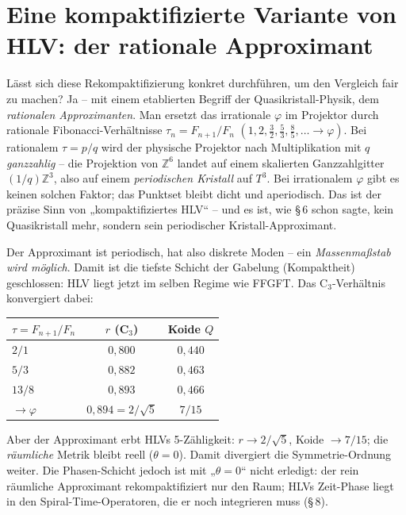 \section{Eine kompaktifizierte Variante von HLV: der rationale Approximant}

Lässt sich diese Rekompaktifizierung konkret durchführen, um den Vergleich fair zu
machen? Ja -- mit einem etablierten Begriff der Quasikristall-Physik, dem
\emph{rationalen Approximanten}. Man ersetzt das irrationale $\varphi$ im Projektor
durch rationale Fibonacci-Verhältnisse $\tau_n=F_{n+1}/F_n$
$(1,2,\tfrac32,\tfrac53,\tfrac85,\dots\to\varphi)$. Bei rationalem $\tau=p/q$ wird
der physische Projektor nach Multiplikation mit $q$ \emph{ganzzahlig} -- die
Projektion von $\mathbb{Z}^6$ landet auf einem skalierten Ganzzahlgitter
$(1/q)\mathbb{Z}^3$, also auf einem \emph{periodischen Kristall} auf $T^3$. Bei
irrationalem $\varphi$ gibt es keinen solchen Faktor; das Punktset bleibt dicht und
aperiodisch. Das ist der präzise Sinn von „kompaktifiziertes HLV`` -- und es ist,
wie §\,6 schon sagte, kein Quasikristall mehr, sondern sein periodischer Kristall-Approximant.

Der Approximant ist periodisch, hat also diskrete Moden -- ein \emph{Massenmaßstab
wird möglich}. Damit ist die tiefste Schicht der Gabelung (Kompaktheit)
geschlossen: HLV liegt jetzt im selben Regime wie FFGFT. Das C$_3$-Verhältnis
konvergiert dabei:

\begin{center}
\begin{tabular}{lcc}
\toprule
$\tau=F_{n+1}/F_n$ & $r$ (C$_3$) & Koide $Q$ \\
\midrule
$2/1$ & $0{,}800$ & $0{,}440$ \\
$5/3$ & $0{,}882$ & $0{,}463$ \\
$13/8$ & $0{,}893$ & $0{,}466$ \\
$\to\varphi$ & $0{,}894=2/\sqrt5$ & $7/15$ \\
\bottomrule
\end{tabular}
\end{center}

Aber der Approximant erbt HLVs 5-Zähligkeit: $r\to2/\sqrt5$, Koide $\to7/15$; die
\emph{räumliche} Metrik bleibt reell ($\theta=0$). Damit divergiert die
Symmetrie-Ordnung weiter. Die Phasen-Schicht jedoch ist mit „$\theta=0$`` nicht
erledigt: der rein räumliche Approximant rekompaktifiziert nur den Raum; HLVs
Zeit-Phase liegt in den Spiral-Time-Operatoren, die er noch integrieren muss (§\,8).


